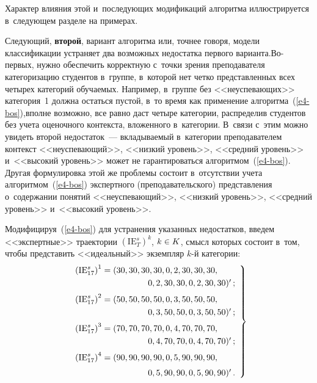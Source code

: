 \begin{multicols}{2}
     Характер влияния этой и~последующих модификаций алгоритма 
иллюстрируется в~следующем разделе на примерах.
     
     Следующий, \textbf{второй}, вариант алгоритма или, точнее говоря, 
модели классификации устраняет два возможных недостатка первого 
варианта.\linebreak Во-пер\-вых, нужно обеспечить корректную с~точки зрения 
преподавателя категоризацию студентов в~группе, в~которой нет четко 
представленных всех четырех категорий обучаемых. Например, в~группе без 
<<неуспевающих>> категория~1 долж\-на остаться пус\-той, в~то время как 
применение алгоритма~(\ref{e4-bos}),\linebreak вполне возможно, все равно даст 
четыре категории, распределив студентов без учета оценочного кон\-текс\-та, 
вложенного в~категории. В~связи с~этим можно увидеть второй  
недостаток~--- вкла\-ды\-ва\-емый в~категории преподавателем кон\-текст 
<<неуспе\-ва\-ющий>>, <<низкий уровень>>, <<средний уровень>> и~<<высокий 
уровень>> может не гарантироваться алгоритмом~(\ref{e4-bos}). Другая 
формулировка этой же проб\-ле\-мы со\-сто\-ит в~отсутствии учета 
алгоритмом~(\ref{e4-bos}) экспертного (преподавательского) пред\-став\-ле\-ния 
о~содержании понятий <<неуспевающий>>, <<низкий уровень>>, <<средний 
уровень>> и~<<высокий уровень>>.
     
     Модифицируя~(\ref{e4-bos}) для устранения указанных недостатков, 
введем <<экспертные>> траектории $(\mathrm{IE}_T^s)^k$, $k\hm\in K$, смысл 
которых состоит в~том, чтобы представить <<идеальный>> экземпляр $k$-й 
категории:
     \begin{equation}
     \left.
     \begin{array}{l}
     \left( \mathrm{IE}^s_{17}\right)^1 = (30, 30, 30, 30, 0, 2, 30, 30, 30,\\[3pt]
     \hspace*{30mm} 0, 2, 30, 30, 0, 2, 30, 30)^\prime\,;\\[6pt]
     \left( \mathrm{IE}^s_{17}\right)^2 = (50, 50, 50, 50, 0, 3, 50, 50, 50,\\[3pt]
           \hspace*{30mm}0, 3, 50, 50, 0, 3, 50, 50)^\prime\,;\\[6pt]
     \left( \mathrm{IE}^s_{17}\right)^3 = (70, 70, 70, 70, 0, 4, 70, 70, 70,\\[3pt]
           \hspace*{30mm}0, 4, 70, 70, 0,4,70,70)^\prime\,;\\[6pt]
     \left( \mathrm{IE}^s_{17}\right)^4 = (90, 90, 90, 90, 0, 5, 90, 90, 90,\\[6pt]
          \hspace*{30mm} 0, 5, 90, 90, 0, 5, 90, 90)^\prime\,.
\end{array}
\right\}
\label{e6a-bos}
     \end{equation}
     

\end{multicols}
